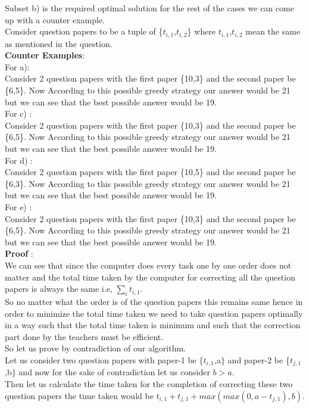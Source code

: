 \documentclass{extarticle}
\theoremstyle{remark}
\newcommand{\tbf}[1]{\textbf{#1}}
\begin{document}
Subset b) is the required optimal solution for the rest of the cases we can come up
with a counter example.\\
Consider question papers to be a tuple of \{$t_{i,1}$,$t_{i,2}$\} where $t_{i,1}$,$t_{i,2}$ mean the same as mentioned in the question.\\
\tbf{Counter Examples}:\\
For a):\\
Consider 2 question papers with the first paper \{10,3\} and the second paper be \{6,5\}.
Now According to this possible greedy strategy our answer would be 21 but we can see that 
the best possible answer would be 19.\\
For c) :\\
Consider 2 question papers with the first paper \{10,3\} and the second paper be \{6,5\}.
Now According to this possible greedy strategy our answer would be 21 but we can see that 
the best possible answer would be 19.\\
For d) : \\
Consider 2 question papers with the first paper \{10,5\} and the second paper be \{6,3\}.
Now According to this possible greedy strategy our answer would be 21 but we can see that 
the best possible answer would be 19.\\
For e) :\\
Consider 2 question papers with the first paper \{10,3\} and the second paper be \{6,5\}.
Now According to this possible greedy strategy our answer would be 21 but we can see that 
the best possible answer would be 19.\\

\tbf{Proof} : \\
We can see that since the computer does every task one by one order does not matter 
and the total time taken by the computer for correcting all the question papers is always 
the same i.e, $\sum_{i} t_{i,1}$.\\
So no matter what the order is of the question papers this remains same hence in order to 
minimize the total time taken we need to take question papers optimally in a way such that
the total time taken is minimum and such that the correction part done by the teachers must
be efficient.\\
So let us prove by contradiction of our algorithm.\\
Let us consider two question papers with paper-1 be \{$t_{i,1}$,a$\}$ and paper-2 be
\{$t_{j,1}$,b$\}$ and now for the sake of contradiction let us consider $b > a$.\\
Then let us calculate the time taken for the completion of correcting these two question papers
the time taken would be $t_{i,1} + t_{j,1} + max(max(0,a-t_{j,1}),b)$.\\
\end{document}
